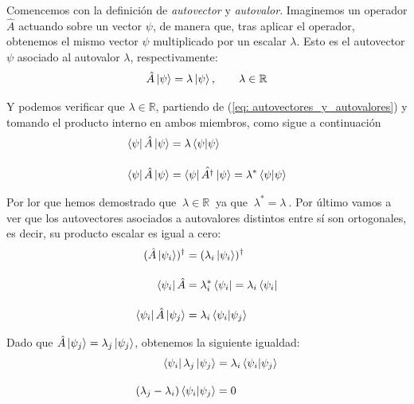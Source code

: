 \documentclass[12pt]{article}
\numberwithin{equation}{section} %
\begin{document}
    \vspace{5mm}

    Comencemos con la definición de \textit{autovector} y \textit{autovalor}. Imaginemos un operador \( \hat{A} \) actuando sobre un vector \( \psi \), de manera que, tras aplicar el operador, obtenemos el mismo vector \( \psi \) multiplicado por un escalar \( \lambda \). Esto es el autovector \( \psi \) asociado al autovalor \( \lambda \), respectivamente:
    \begin{equation}
        \hat{A} \ket{\psi} = \lambda \ket{\psi}, \qquad \lambda \in \mathbb{R}
        \label{eq: autovectores_y_autovalores}
    \end{equation}

    \vspace{1.5mm}

    Y podemos verificar que \( \lambda \in \mathbb{R} \), partiendo de (\ref{eq: autovectores_y_autovalores}) y tomando el producto interno en ambos miembros, como sigue a continuación
    \begin{align*}
        \bra{\psi} \hat{A} \ket{\psi} &= \lambda \braket{\psi | \psi} \\[10pt]
        \bra{\psi} \hat{A} \ket{\psi} &= \bra{\psi} {\hat{A ^ {\dagger}}} \ket{\psi} = \lambda ^ {*} \braket{\psi | \psi} 
    \end{align*}

    \vspace{1.5mm}

    Por lor que hemos demostrado que \( \ \lambda \in \mathbb{R} \ \) ya que \( \ \lambda ^ {*} = \lambda \ \). Por último vamos a ver que los autovectores asociados a autovalores distintos entre sí son ortogonales, es decir, su producto escalar es igual a cero:
    \begin{align*}
        (\hat{A} \ket{\psi_{i}})^{\dagger} &= (\lambda_{i} \ket{\psi_{i}})^{\dagger} \\[10pt]
        \bra{\psi_{i}} \hat{A} &= \lambda_{i}^{*} \bra{\psi_{i}} = \lambda_{i} \bra{\psi_{i}} \\[10pt]
        \bra{\psi_{i}} \hat{A} \ket{\psi_{j}} &= \lambda_{i} \braket{\psi_{i} | \psi_{j}}
    \end{align*}

    \vspace{1.5mm}

    Dado que \( \hat{A} \ket{\psi_{j}} = \lambda_{j} \ket{\psi_{j}} \), obtenemos la siguiente igualdad:
    \begin{align*}
        \bra{\psi_{i}} \lambda_{j} \ket{\psi_{j}} &= \lambda_{i} \braket{\psi_{i} | \psi_{j}} \\[10pt]
        ( \lambda_{j} - \lambda_{i} ) \braket{\psi_{i} | \psi_{j}} &= 0
    \end{align*}
\end{document}
